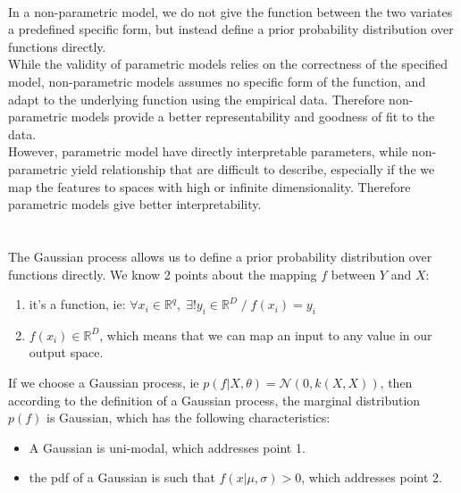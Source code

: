 \documentclass[a4paper,11pt]{article}
\theoremstyle{mytheor}
\begin{document}
\smallskip
\\ In a non-parametric model, we do not give the function between the two variates a predefined specific form, but instead define a prior probability distribution over functions directly.\\
While the validity of parametric
models relies on the correctness of the specified model, non-parametric models assumes no specific form of the function, and adapt
to the underlying function using the empirical
data. Therefore non-parametric models provide a better representability and goodness of fit to the data.\\
However, parametric model have directly interpretable parameters, while non-parametric yield relationship that are difficult to describe, especially if the we map the features to spaces with high or infinite dimensionality. Therefore parametric models give better interpretability.
\smallskip
\\\\
\smallskip
\\ The Gaussian process allows us to define a prior probability distribution over functions directly. We know 2 points about the mapping $f$ between $Y$ and $X$: 
\begin{enumerate}
\item it's a function, ie: $ \forall x_i \in \mathbb{R}^q,  \; \exists ! y_i \in \mathbb{R}^D\;/ \; f(x_i) = y_i $
\item $ f(x_i) \in \mathbb{R}^D$, which means that we can map an input to any value in our output space.
\end{enumerate}
If we choose a Gaussian process, ie $p(f|X,\theta) = \mathcal{N}(0, k(X,X)) $, then according to the definition of a Gaussian process, the marginal distribution $p(f)$ is Gaussian, which has the following characteristics: 
\begin{itemize}
\item A Gaussian is uni-modal, which addresses point 1.
\item the pdf of a Gaussian is such that $f(x|\mu, \sigma) > 0$, which addresses point 2.
\end{itemize}
\end{document}
